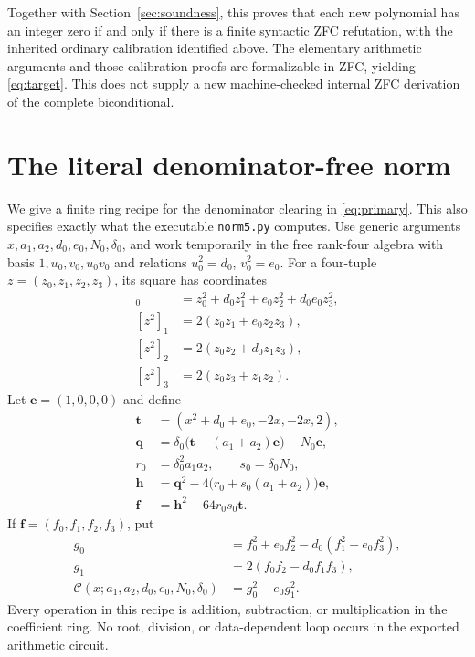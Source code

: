 Together with Section~\ref{sec:soundness}, this proves that each new
polynomial has an integer zero if and only if there is a finite
syntactic ZFC refutation, with the inherited ordinary calibration
identified above. The elementary arithmetic arguments and those
calibration proofs are formalizable in ZFC, yielding
\eqref{eq:target}. This does not supply a new machine-checked internal
ZFC derivation of the complete biconditional.

\section{The literal denominator-free norm}\label{sec:clearing}

We give a finite ring recipe for the denominator clearing in
\eqref{eq:primary}. This also specifies exactly what the executable
\texttt{norm5.py} computes. Use generic arguments
$x,a_1,a_2,d_0,e_0,N_0,\delta_0$, and work temporarily in the
free rank-four algebra with basis $1,u_0,v_0,u_0v_0$ and relations
$u_0^2=d_0$, $v_0^2=e_0$. For a four-tuple $z=(z_0,z_1,z_2,z_3)$,
its square has coordinates
\begin{align*}
 [z^2]_0&=z_0^2+d_0z_1^2+e_0z_2^2+d_0e_0z_3^2,\\
 [z^2]_1&=2(z_0z_1+e_0z_2z_3),\\
 [z^2]_2&=2(z_0z_2+d_0z_1z_3),\\
 [z^2]_3&=2(z_0z_3+z_1z_2).
\end{align*}
Let $\mathbf e=(1,0,0,0)$ and define
\begin{align*}
 \mathbf t&=(x^2+d_0+e_0,-2x,-2x,2),\\
 \mathbf q&=\delta_0\bigl(\mathbf t-(a_1+a_2)\mathbf e\bigr)
                      -N_0\mathbf e,\\
 r_0&=\delta_0^2a_1a_2,\qquad s_0=\delta_0N_0,\\
 \mathbf h&=\mathbf q^2-4\bigl(r_0+s_0(a_1+a_2)\bigr)\mathbf e,\\
 \mathbf f&=\mathbf h^2-64r_0s_0\mathbf t.
\end{align*}
If $\mathbf f=(f_0,f_1,f_2,f_3)$, put
\begin{align*}
 g_0&=f_0^2+e_0f_2^2-d_0(f_1^2+e_0f_3^2),\\
 g_1&=2(f_0f_2-d_0f_1f_3),\\
 \mathcal C(x;a_1,a_2,d_0,e_0,N_0,\delta_0)&=g_0^2-e_0g_1^2.
\end{align*}
Every operation in this recipe is addition, subtraction, or
multiplication in the coefficient ring. No root, division, or
data-dependent loop occurs in the exported arithmetic circuit.

